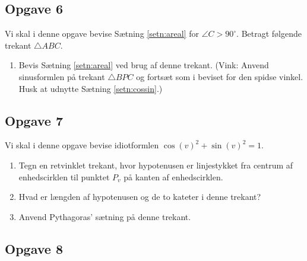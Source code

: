 \subsection*{Opgave 6}
	Vi skal i denne opgave bevise Sætning \ref{setn:areal} for $\angle C > 90^{\circ}$. 
	Betragt følgende trekant $\triangle ABC$.
	\begin{center}
	\end{center}
	\begin{enumerate}[label=\roman*)]
		\item Bevis Sætning \ref{setn:areal} ved brug af denne trekant. (Vink: Anvend sinusformlen på
		 trekant $\triangle BPC$ og fortsæt som i beviset for den spidse vinkel. Husk at udnytte 
		 Sætning \ref{setn:cossin}.)
	\end{enumerate}
\subsection*{Opgave 7}

Vi skal i denne opgave bevise idiotformlen $\cos(v)^2 + \sin(v)^2 = 1$.

\begin{enumerate}[label=\roman*)]
	\item Tegn en retvinklet trekant, hvor hypotenusen er linjestykket fra centrum af enhedscirklen til 
	punktet $P_v$ på kanten af enhedscirklen. 
	\item Hvad er længden af hypotenusen og de to kateter i denne trekant?
	\item Anvend Pythagoras' sætning på denne trekant.
\end{enumerate}

\subsection*{Opgave 8}

